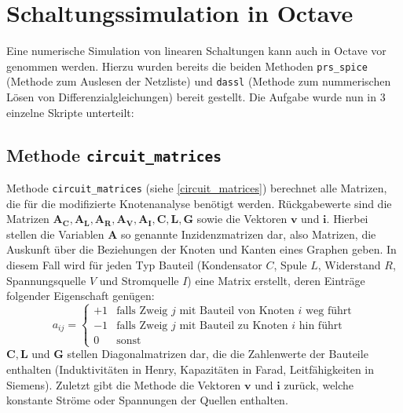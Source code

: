 \section{Schaltungssimulation in Octave}\label{sec:ag2.3}
Eine numerische Simulation von linearen Schaltungen kann auch in Octave vor genommen werden. Hierzu wurden bereits die beiden Methoden \texttt{prs\_spice} (Methode zum Auslesen der Netzliste) und \texttt{dassl} (Methode zum nummerischen Lösen von Differenzialgleichungen) bereit gestellt.
Die Aufgabe wurde nun in 3 einzelne Skripte unterteilt:

\subsection*{Methode \texttt{circuit\_matrices}}
	Methode \texttt{circuit\_matrices} (siehe \ref{circuit_matrices}) berechnet alle Matrizen, die für die modifizierte Knotenanalyse benötigt werden. Rückgabewerte sind die Matrizen $\mathbf{A_C, A_L, A_R, A_V, A_I, C, L, G}$ sowie die Vektoren $\mathbf{v}$ und $\mathbf{i}$. Hierbei stellen die Variablen $\mathbf{A}$ so genannte Inzidenzmatrizen dar, also Matrizen, die Auskunft über die Beziehungen der Knoten und Kanten eines Graphen geben. In diesem Fall wird für jeden Typ Bauteil (Kondensator $C$, Spule $L$, Widerstand $R$, Spannungsquelle $V$ und Stromquelle $I$) eine Matrix erstellt, deren Einträge folgender Eigenschaft genügen:
	\begin{equation}
	a_{ij} = \begin{cases}
	+1 & \text{falls Zweig }j \text{ mit Bauteil von Knoten }i \text{ weg führt} \\
	-1 & \text{falls Zweig }j \text{ mit Bauteil zu Knoten }i \text{ hin führt} \\
	0  & \text{sonst}
	\end{cases}
	\end{equation}
	$\mathbf{C, L}$ und $\mathbf{G}$ stellen Diagonalmatrizen dar, die die Zahlenwerte der Bauteile enthalten (Induktivitäten in
	Henry, Kapazitäten in Farad, Leitfähigkeiten in Siemens). Zuletzt gibt die Methode die Vektoren $\mathbf{v}$ und $\mathbf{i}$ zurück, welche konstante Ströme oder Spannungen der Quellen enthalten.
	
